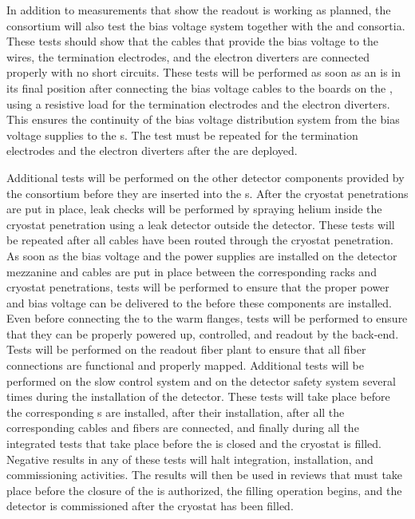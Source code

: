 In addition to measurements that show the 
readout is working as planned, the  consortium will also
test the bias voltage system together with the 
and  consortia. These tests should show that
the cables that provide the bias voltage to the  wires, the
 termination electrodes, and the electron diverters are connected
properly with no short circuits. %
These tests will be performed as soon as an 
is in its final position after connecting the bias voltage cables to the 
 boards on the , using a resistive load for the 
 termination electrodes and the electron diverters. This ensures
the continuity of the bias voltage distribution system from the bias voltage
supplies to the s. The test must be repeated for the 
termination electrodes and the electron diverters after 
the  are deployed.

Additional tests will be performed on the other detector components
provided by the  consortium before they are inserted into the
s. After the cryostat penetrations are put in place, leak checks
will be performed by spraying helium inside the cryostat penetration using 
a leak detector outside the detector. These tests will be repeated 
after all cables have been routed through the cryostat penetration.
As soon as the bias voltage and the power supplies are installed on the detector
mezzanine and cables are put in place between the corresponding racks and
cryostat penetrations, tests will be performed to ensure that the proper 
power and bias voltage can be delivered to the  before these components
are installed. Even before connecting the  to the warm flanges,
tests will be performed to ensure that they can be properly powered up, controlled,
and readout by the  back-end. Tests will be performed on the
readout fiber plant to ensure that all fiber connections are functional
and properly mapped. Additional tests will be performed on the slow control
system and on the detector safety system several times during the
installation of the detector. These tests will take place before the
corresponding s are installed, after their installation, after
all the corresponding cables and fibers are connected, and finally
during all the integrated tests that take place before
the  is closed and the cryostat is filled. Negative results in any
of these tests will halt integration, installation, and
commissioning activities. The results will then be used in reviews that must
take place before the closure of the  is authorized, the  filling operation begins, and the detector is
commissioned after the cryostat has been filled.

